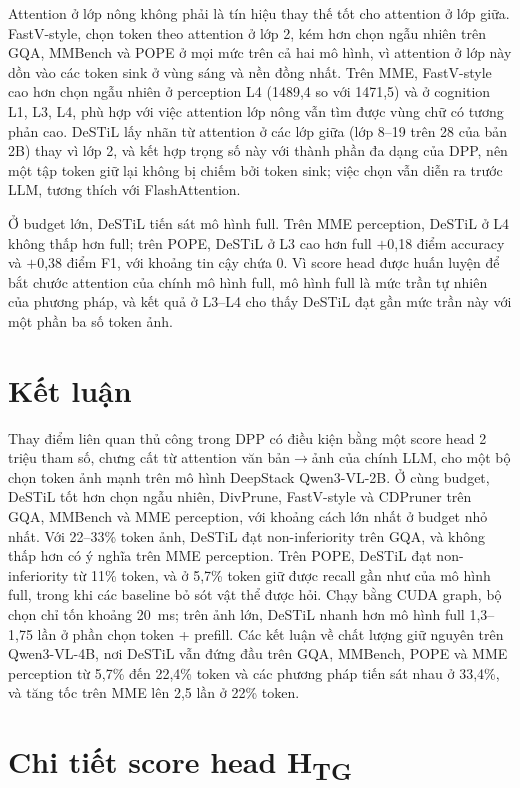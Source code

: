 \documentclass[conference]{IEEEtran}
\newcommand{\pl}{\ensuremath{+}}
\newcommand{\Htg}{H\textsubscript{TG}}
\begin{document}
Attention ở lớp nông không phải là tín hiệu thay thế tốt cho attention ở lớp giữa. FastV-style, chọn token theo attention ở lớp 2, kém hơn chọn ngẫu nhiên trên GQA, MMBench và POPE ở mọi mức trên cả hai mô hình, vì attention ở lớp này dồn vào các token sink ở vùng sáng và nền đồng nhất. Trên MME, FastV-style cao hơn chọn ngẫu nhiên ở perception L4 (1489,4 so với 1471,5) và ở cognition L1, L3, L4, phù hợp với việc attention lớp nông vẫn tìm được vùng chữ có tương phản cao. DeSTiL lấy nhãn từ attention ở các lớp giữa (lớp 8--19 trên 28 của bản 2B) thay vì lớp 2, và kết hợp trọng số này với thành phần đa dạng của DPP, nên một tập token giữ lại không bị chiếm bởi token sink; việc chọn vẫn diễn ra trước LLM, tương thích với FlashAttention.

Ở budget lớn, DeSTiL tiến sát mô hình full. Trên MME perception, DeSTiL ở L4 không thấp hơn full; trên POPE, DeSTiL ở L3 cao hơn full \pl0,18 điểm accuracy và \pl0,38 điểm F1, với khoảng tin cậy chứa 0. Vì score head được huấn luyện để bắt chước attention của chính mô hình full, mô hình full là mức trần tự nhiên của phương pháp, và kết quả ở L3--L4 cho thấy DeSTiL đạt gần mức trần này với một phần ba số token ảnh.

\section{Kết luận}
Thay điểm liên quan thủ công trong DPP có điều kiện bằng một score head 2 triệu tham số, chưng cất từ attention văn bản$\rightarrow$ảnh của chính LLM, cho một bộ chọn token ảnh mạnh trên mô hình DeepStack Qwen3-VL-2B. Ở cùng budget, DeSTiL tốt hơn chọn ngẫu nhiên, DivPrune, FastV-style và CDPruner trên GQA, MMBench và MME perception, với khoảng cách lớn nhất ở budget nhỏ nhất. Với 22--33\% token ảnh, DeSTiL đạt non-inferiority trên GQA, và không thấp hơn có ý nghĩa trên MME perception. Trên POPE, DeSTiL đạt non-inferiority từ 11\% token, và ở 5,7\% token giữ được recall gần như của mô hình full, trong khi các baseline bỏ sót vật thể được hỏi. Chạy bằng CUDA graph, bộ chọn chỉ tốn khoảng 20~ms; trên ảnh lớn, DeSTiL nhanh hơn mô hình full 1,3--1,75 lần ở phần chọn token + prefill. Các kết luận về chất lượng giữ nguyên trên Qwen3-VL-4B, nơi DeSTiL vẫn đứng đầu trên GQA, MMBench, POPE và MME perception từ 5,7\% đến 22,4\% token và các phương pháp tiến sát nhau ở 33,4\%, và tăng tốc trên MME lên 2,5 lần ở 22\% token.

\FloatBarrier
\appendices
\section{Chi tiết score head \Htg}
\label{app:head}
\end{document}
